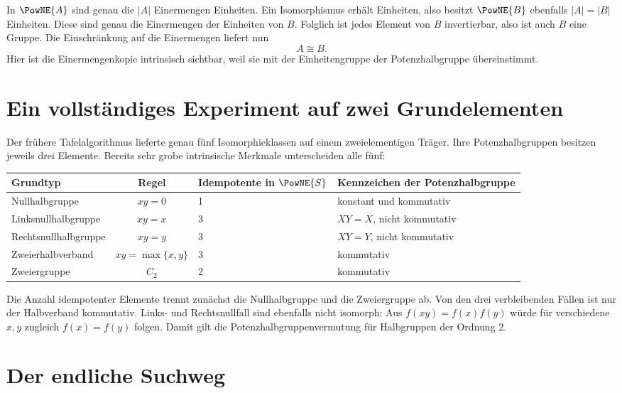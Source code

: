 \documentclass[main.tex]{subfiles}
\begin{document}
In \(\PowNE{A}\) sind genau die \(|A|\) Einermengen Einheiten.  Ein
Isomorphismus erhält Einheiten, also besitzt \(\PowNE{B}\) ebenfalls
\(|A|=|B|\) Einheiten.  Diese sind genau die Einermengen der Einheiten von
\(B\).  Folglich ist jedes Element von \(B\) invertierbar, also ist auch
\(B\) eine Gruppe.  Die Einschränkung auf die Einermengen liefert nun
\[
  A\cong B.
\]
Hier ist die Einermengenkopie intrinsisch sichtbar, weil sie mit der
Einheitengruppe der Potenzhalbgruppe übereinstimmt.

\section{Ein vollständiges Experiment auf zwei Grundelementen}

Der frühere Tafelalgorithmus lieferte genau fünf Isomorphieklassen auf einem
zweielementigen Träger.  Ihre Potenzhalbgruppen besitzen jeweils drei
Elemente.  Bereits sehr grobe intrinsische Merkmale unterscheiden alle fünf:
\begin{center}
\small
\begin{tabularx}{\textwidth}{@{}lclX@{}}
\toprule
\textbf{Grundtyp}&\textbf{Regel}&
\textbf{Idempotente in \(\PowNE{S}\)}&\textbf{Kennzeichen der Potenzhalbgruppe}\\
\midrule
Nullhalbgruppe&\(xy=0\)&1&konstant und kommutativ\\
Linksnullhalbgruppe&\(xy=x\)&3&\(XY=X\), nicht kommutativ\\
Rechtsnullhalbgruppe&\(xy=y\)&3&\(XY=Y\), nicht kommutativ\\
Zweierhalbverband&\(xy=\max\{x,y\}\)&3&kommutativ\\
Zweiergruppe&\(C_2\)&2&kommutativ\\
\bottomrule
\end{tabularx}
\end{center}
Die Anzahl idempotenter Elemente trennt zunächst die Nullhalbgruppe und die
Zweiergruppe ab.  Von den drei verbleibenden Fällen ist nur der Halbverband
kommutativ.  Links- und Rechtsnullfall sind ebenfalls nicht isomorph: Aus
\(f(xy)=f(x)f(y)\) würde für verschiedene \(x,y\) zugleich
\(f(x)=f(y)\) folgen.  Damit gilt die Potenzhalbgruppenvermutung für
Halbgruppen der Ordnung \(2\).

\section{Der endliche Suchweg}
\end{document}
